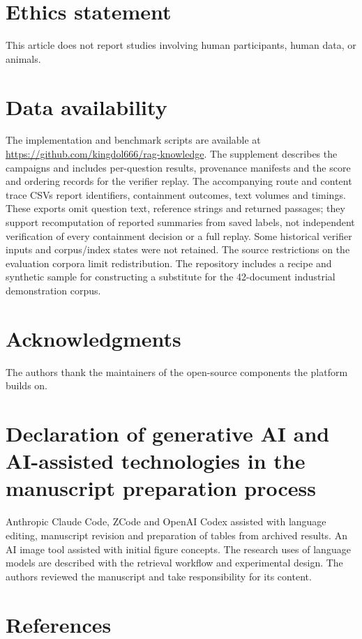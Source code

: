\section*{Ethics statement}
This article does not report studies involving human participants, human
data, or animals.

\section*{Data availability}
The implementation and benchmark scripts are available at
\url{https://github.com/kingdol666/rag-knowledge}. The supplement describes
the campaigns and includes per-question results, provenance manifests and
the score and ordering records for the verifier replay. The accompanying
route and content trace CSVs report identifiers, containment outcomes, text
volumes and timings. These exports omit question text, reference strings and
returned passages; they support recomputation of reported summaries from saved
labels, not independent verification of every containment decision or a full
replay. Some historical verifier inputs and corpus/index states were not
retained. The source restrictions on the evaluation corpora limit
redistribution. The repository includes a recipe and synthetic sample for
constructing a substitute for the 42-document industrial demonstration
corpus.

\section*{Acknowledgments}
The authors thank the maintainers of the open-source components the platform
builds on. 
\section*{Declaration of generative AI and AI-assisted technologies in the manuscript preparation process}
Anthropic Claude Code, ZCode and OpenAI Codex assisted with language editing,
manuscript revision and preparation of tables from archived results. An AI
image tool assisted with initial figure concepts. The research uses of
language models are described with the retrieval workflow and experimental
design. The authors reviewed the manuscript and take responsibility for its
content.


\section*{References}

